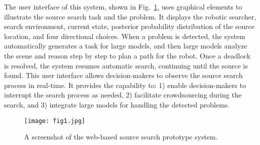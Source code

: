 
The user interface of this system, shown in Fig.~\ref{fig:system}, uses graphical elements to illustrate the source search task and the problem. It displays the robotic searcher, search environment, current state, posterior probability distribution of the source location, and four directional choices. When a problem is detected, the system automatically generates a task for large models, and then large models analyze the scene and reason step by step to plan a path for the robot. Once a deadlock is resolved, the system resumes automatic search, continuing until the source is found. This user interface allows decision-makers to observe the source search process in real-time. It provides the capability to: 1) enable decision-makers to interrupt the search process as needed, 2) facilitate crowdsourcing during the search, and 3) integrate large models for handling the detected problems.

\begin{figure}[htbp]
    \centering
    \texttt{[image: fig1.jpg]}
    \caption{A screenshot of the web-based source search prototype system.}
    \label{fig:system}
\end{figure}




